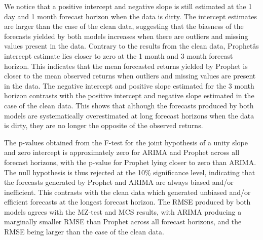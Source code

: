 \documentclass[12pt,a4paper]{article}
\numberwithin{equation}{section}
\numberwithin{figure}{section}
\numberwithin{table}{section}
\let\origtable\table
\let\endorigtable\endtable
\renewenvironment{table}[1][2] {
    \expandafter\origtable\expandafter[H]
} {
    \endorigtable
}
\begin{document}
\begin{table}[H]
\centering
\caption{MCS, MZ-test and RMSE results based on dirty data \label{tab2}} 
\end{table}

We notice that a positive intercept and negative slope is still
estimated at the 1 day and 1 month forecast horizon when the data is
dirty. The intercept estimates are larger than the case of the clean
data, suggesting that the biasness of the forecasts yielded by both
models increases when there are outliers and missing values present in
the data. Contrary to the results from the clean data, Prophetâs
intercept estimate lies closer to zero at the 1 month and 3 month
forecast horizon. This indicates that the mean forecasted returns
yielded by Prophet is closer to the mean observed returns when outliers
and missing values are present in the data. The negative intercept and
positive slope estimated for the 3 month horizon contrasts with the
positive intercept and negative slope estimated in the case of the clean
data. This shows that although the forecasts produced by both models are
systematically overestimated at long forecast horizons when the data is
dirty, they are no longer the opposite of the observed returns.

The p-values obtained from the F-test for the joint hypothesis of a
unity slope and zero intercept is approximately zero for ARIMA and
Prophet across all forecast horizons, with the p-value for Prophet lying
closer to zero than ARIMA. The null hypothesis is thus rejected at the
10\% significance level, indicating that the forecasts generated by
Prophet and ARIMA are always biased and/or inefficient. This contrasts
with the clean data which generated unbiased and/or efficient forecasts
at the longest forecast horizon. The RMSE produced by both models agrees
with the MZ-test and MCS results, with ARIMA producing a marginally
smaller RMSE than Prophet across all forecast horizons, and the RMSE
being larger than the case of the clean data.
\end{document}
